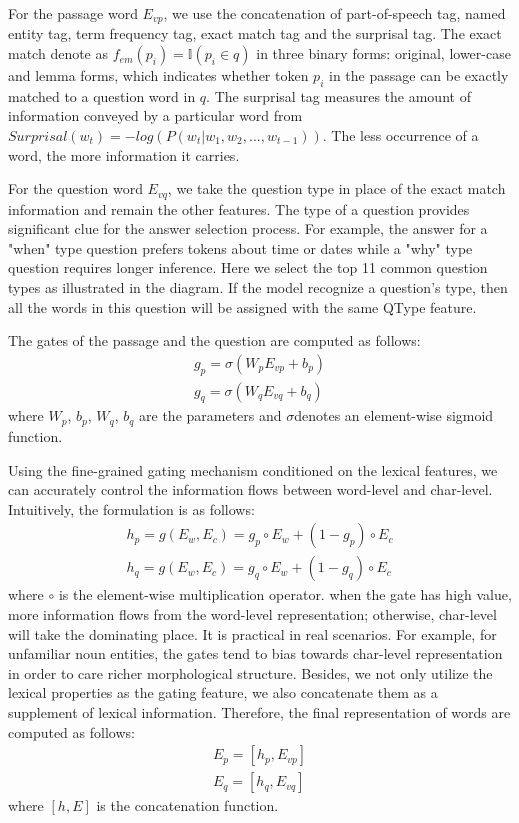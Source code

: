 \documentclass[letterpaper]{article} %
\begin{document}
   For the passage word $E_{vp}$, we use the concatenation of part-of-speech tag, named entity tag, term frequency tag, exact match tag and the surprisal tag. The exact match denote as $f_{em}(p_i)=\mathbb{I}(p_i \in q)$ in three binary forms: original, lower-case and lemma forms, which indicates whether  token $p_i$ in the passage can be exactly matched to a question word in $q$. The surprisal tag measures the amount of information conveyed by a particular word from  $Surprisal(w_t)=-log(P(w_t|w_1,w_2,...,w_{t-1}))$. The less occurrence of a word, the more information it carries. 
   
   For the question word $E_{vq}$, we take the question type in place of the exact match information and remain the other features. The type of a question provides significant clue for the answer selection process. For example, the answer for a "when" type question prefers tokens about time or dates while a "why" type question requires longer inference. Here we select the top 11 common question types as illustrated in the diagram. If the model recognize a question's type, then all the words in this question will be assigned with the same QType feature.
   
   The gates of the passage and the question are computed as follows:
   \begin{align*}
    g_p=\sigma(W_pE_{vp}+b_p) \\
   g_q=\sigma(W_qE_{vq}+b_q)   \tag{1} 
   \end{align*}
   where $W_p$, $b_p$, $W_q$, $b_q$ are the parameters and  $\sigma$denotes an element-wise sigmoid function.
   
   Using the fine-grained gating mechanism conditioned on the lexical features, we can accurately control the information flows between word-level and char-level. Intuitively, the formulation is as follows:
   \begin{align*}
   h_p=g(E_w,E_c)=g_p\circ E_w+(1-g_p)\circ E_c \\
   h_q=g(E_w,E_c)=g_q\circ E_w+(1-g_q)\circ E_c \tag{2}
   \end{align*}
   where $\circ$ is the element-wise multiplication operator. when the gate has high value, more information flows from the word-level representation; otherwise, char-level will take the dominating place. It is practical in real scenarios. For example, for unfamiliar noun entities, the gates tend to bias towards char-level representation in order to care richer morphological structure. Besides, we not only utilize the lexical properties as the gating feature, we also concatenate them as a supplement of lexical information. Therefore, the final representation of words are computed as follows:
   \begin{align*}
   E_p=[h_p,E_{vp}] \\
   E_q=[h_q,E_{vq}] \tag{3} 
   \end{align*} 
   where $[h,E]$ is the concatenation function.
\end{document}
